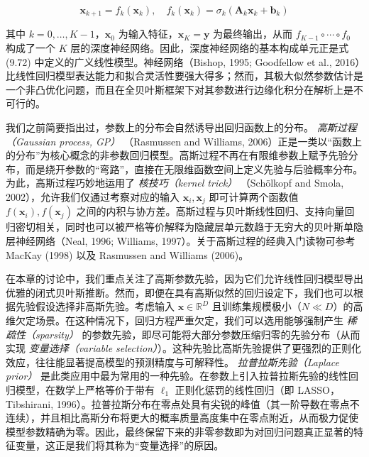 \begin{equation}
\boldsymbol{x}_{k+1} = f_k(\boldsymbol{x}_k) , \quad f_k(\boldsymbol{x}_k) = \sigma_k(\boldsymbol{A}_k\boldsymbol{x}_k + \boldsymbol{b}_k)
\tag{9.72}
\end{equation}

其中 $ k = 0, \ldots, K-1 $，$ \boldsymbol{x}_0 $ 为输入特征，$ \boldsymbol{x}_K = \boldsymbol{y} $ 为最终输出，从而 $ f_{K-1} \circ \cdots \circ f_0 $ 构成了一个 $ K $ 层的深度神经网络。因此，深度神经网络的基本构成单元正是式 (9.72) 中定义的广义线性模型。神经网络（Bishop, 1995; Goodfellow et al., 2016）比线性回归模型表达能力和拟合灵活性要强大得多；然而，其极大似然参数估计是一个非凸优化问题，而且在全贝叶斯框架下对其参数进行边缘化积分在解析上是不可行的。

我们之前简要指出过，参数上的分布会自然诱导出回归函数上的分布。 \emph{高斯过程（Gaussian process, GP）} （Rasmussen and Williams, 2006）正是一类以“函数上的分布”为核心概念的非参数回归模型。高斯过程不再在有限维参数上赋予先验分布，而是绕开参数的“弯路”，直接在无限维函数空间上定义先验与后验概率分布。为此，高斯过程巧妙地运用了 \emph{核技巧（kernel trick）} （Schölkopf and Smola, 2002），允许我们仅通过考察对应的输入 $ \boldsymbol{x}_i, \boldsymbol{x}_j $ 即可计算两个函数值 $ f(\boldsymbol{x}_i), f(\boldsymbol{x}_j) $ 之间的内积与协方差。高斯过程与贝叶斯线性回归、支持向量回归密切相关，同时也可以被严格等价解释为隐藏层单元数趋于无穷大的贝叶斯单隐层神经网络（Neal, 1996; Williams, 1997）。关于高斯过程的经典入门读物可参考 MacKay (1998) 以及 Rasmussen and Williams (2006)。

在本章的讨论中，我们重点关注了高斯参数先验，因为它们允许线性回归模型导出优雅的闭式贝叶斯推断。然而，即便在具有高斯似然的回归设定下，我们也可以根据先验假设选择非高斯先验。考虑输入 $ \boldsymbol{x} \in \mathbb{R}^D $ 且训练集规模极小（$ N \ll D $）的高维欠定场景。在这种情况下，回归方程严重欠定，我们可以选用能够强制产生 \emph{稀疏性（sparsity）} 的参数先验，即尽可能将大部分参数压缩归零的先验分布（从而实现 \emph{变量选择（variable selection）}）。这种先验比高斯先验提供了更强烈的正则化效应，往往能显著提高模型的预测精度与可解释性。 \emph{拉普拉斯先验（Laplace prior）} 是此类应用中最为常用的一种先验。在参数上引入拉普拉斯先验的线性回归模型，在数学上严格等价于带有 $ \ell_1 $ 正则化惩罚的线性回归（即 LASSO，Tibshirani, 1996）。拉普拉斯分布在零点处具有尖锐的峰值（其一阶导数在零点不连续），并且相比高斯分布将更大的概率质量高度集中在零点附近，从而极力促使模型参数精确为零。因此，最终保留下来的非零参数即为对回归问题真正显著的特征变量，这正是我们将其称为“变量选择”的原因。
